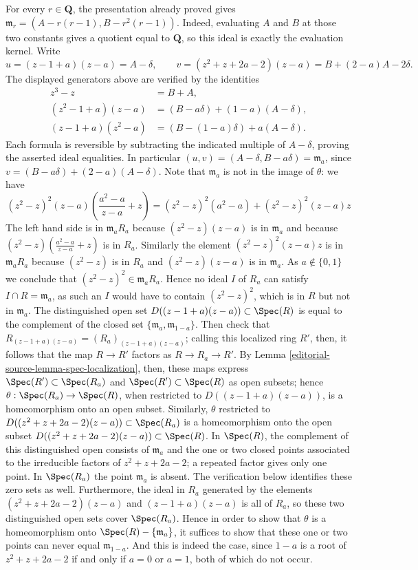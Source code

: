 \begin{example}
$$$$
For every $r\in\mathbf Q$, the presentation already proved gives
$\mathfrak m_r=(A-r(r-1),B-r^2(r-1))$.
Indeed, evaluating $A$ and $B$ at those two constants gives a quotient
equal to $\mathbf Q$, so this ideal is exactly the evaluation kernel.
Write
$$
u=(z-1+a)(z-a)=A-\delta,\qquad
v=(z^2+z+2a-2)(z-a)=B+(2-a)A-2\delta.
$$
The displayed generators above are verified by the identities
$$
\begin{aligned}
z^3-z&=B+A,\\
(z^2-1+a)(z-a)&=(B-a\delta)+(1-a)(A-\delta),\\
(z-1+a)(z^2-a)&=(B-(1-a)\delta)+a(A-\delta).
\end{aligned}
$$
Each formula is reversible by subtracting the indicated multiple
of $A-\delta$, proving the asserted ideal equalities.
In particular $(u,v)=(A-\delta,B-a\delta)=\mathfrak m_a$,
since $v=(B-a\delta)+(2-a)(A-\delta)$.
Note that
$\mathfrak{m}_a$ is not in the image of $\theta$: we have
$$
(z^2 - z)^2(z - a)\left(\frac{a^2 - a}{z - a} + z\right) =
(z^2 - z)^2(a^2 - a) + (z^2 - z)^2(z - a)z
$$
The left hand side is in $\mathfrak m_a R_a$ because
$(z^2 - z)(z - a)$ is in $\mathfrak m_a$ and because
$(z^2 - z)(\frac{a^2 - a}{z - a} + z)$ is in $R_a$. Similarly
the element $(z^2 - z)^2(z - a)z$ is in $\mathfrak m_a R_a$
because $(z^2 - z)$ is in $R_a$ and $(z^2 - z)(z - a)$ is in $\mathfrak m_a$.
As $a \not \in \{0, 1\}$ we conclude that
$(z^2 - z)^2 \in \mathfrak m_a R_a$. Hence
no ideal $I$ of $R_a$ can satisfy $I \cap R = \mathfrak m_a$, as such
an $I$ would have to contain $(z^2 - z)^2$, which is in $R$ but not in
$\mathfrak m_a$. The distinguished open set
$D((z-1 + a)(z-a))\subset\Spec(R)$ is equal to the complement of
the closed set $\{\mathfrak{m}_a, \mathfrak{m}_{1-a}\}$.
Then check that $R_{(z-1 + a)(z-a)} = (R_a)_{(z-1 + a)(z-a)}$; calling
this localized ring $R'$, then, it follows that the map $R \to R'$
factors as $R \to R_a \to R'$.  By Lemma
\ref{editorial-source-lemma-spec-localization}, then, these maps express
$\Spec(R') \subset \Spec(R_a)$ and
$\Spec(R') \subset \Spec(R)$ as open subsets; hence
$\theta : \Spec(R_a) \to \Spec(R)$, when restricted to
$D((z-1 + a)(z-a))$, is a homeomorphism onto an open subset.
Similarly, $\theta$ restricted to
$D((z^2 + z + 2a-2)(z-a)) \subset \Spec(R_a)$ is a homeomorphism
onto the open subset $D((z^2 + z + 2a-2)(z-a)) \subset \Spec(R)$.
In $\Spec(R)$, the complement of this distinguished open consists
of $\mathfrak m_a$ and the one or two closed points associated to the
irreducible factors of $z^2+z+2a-2$; a repeated factor gives only one point.
In $\Spec(R_a)$ the point $\mathfrak m_a$ is absent.
The verification below identifies these zero sets as well.
Furthermore, the ideal in $R_a$ generated by the
elements $(z^2 + z + 2a-2)(z-a)$ and $(z-1 + a)(z-a)$ is all of $R_a$, so
these two distinguished open sets cover $\Spec(R_a)$. Hence in
order to show that $\theta$ is a homeomorphism onto
$\Spec(R)-\{\mathfrak{m}_a\}$, it suffices to show
that these one or two points can never equal $\mathfrak{m}_{1-a}$.
And this is indeed the case, since $1-a$ is a root of $z^2 + z + 2a-2$
if and only if $a = 0$ or $a = 1$, both of which do not occur.


\end{example}
